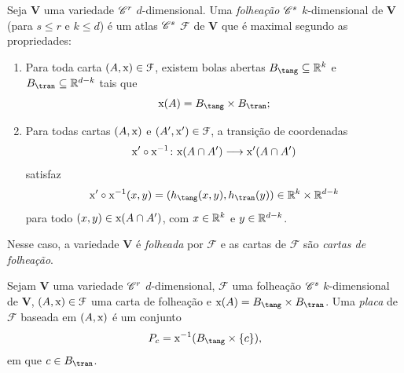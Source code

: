 \begin{defi}
Seja $\bm V$ uma variedade $\mathscr{C}^r$ $d$-dimensional. Uma \emph{folheação $\mathscr{C}^{s}$} $k$-dimensional de $\bm V$ (para $s \leq r$ e $k \leq d$) é um atlas $\mathscr{C}^{s}$ $\mathcal F$ de $\bm V$ que é maximal segundo as propriedades:
	\begin{enumerate}
	\item Para toda carta $(A,\mathrm{x}) \in \mathcal F$, existem bolas abertas $B_\tang \subseteq \R^{k}$ e $B_\tran \subseteq \R^{d-k}$ tais que
		\begin{equation*}
		\x(A) = B_\tang \times B_\tran;
		\end{equation*}
	\item Para todas cartas $(A,\mathrm{x})$ e $(A',\mathrm{x}') \in \mathcal F$, a transição de coordenadas
		\begin{equation*}
		\mathrm{x}' \circ \mathrm{x}^{-1}\colon \mathrm{x}(A \cap A') \longrightarrow \mathrm{x}'(A \cap A')
		\end{equation*}
satisfaz
	\begin{equation*}
	\x' \circ \x\inv(x,y) = (h_\tang(x,y),h_\tran(y)) \in \R^{k} \times \R^{d-k}
	\end{equation*}
para todo $(x,y) \in \mathrm{x}(A \cap A')$, com $x \in \mathbb{R}^{k}$ e $y \in \mathbb{R}^{d-k}$.
	\end{enumerate}
Nesse caso, a variedade $\bm V$ é \emph{folheada} por $\mathcal F$ e as cartas de $\mathcal F$ são \emph{cartas de folheação}.
\end{defi}

\begin{defi}
Sejam $\bm V$ uma variedade $\mathscr{C}^r$ $d$-dimensional, $\mathcal F$ uma folheação $\mathscr{C}^{s}$ $k$-dimensional de $\bm V$, $(A,\mathrm{x}) \in \mathcal F$ uma carta de folheação e $\x(A) = B_\tang \times B_\tran$. Uma \emph{placa} de $\mathcal F$ baseada em $(A,\mathrm{x})$ é um conjunto
	\begin{equation*}
	P_c = \x\inv(B_\tang \times \{c\}),
	\end{equation*}
em que $c \in B_\tran$.
\end{defi}

